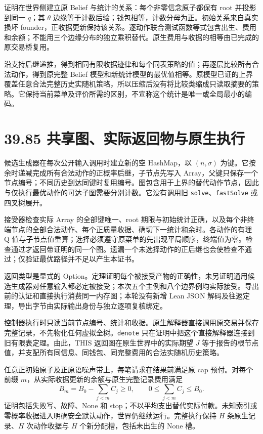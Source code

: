 \documentclass[
  11pt,
  oneside]{book}
\begin{document}
证明在世界侧建立原 Belief 与统计的关系：每个非零信念原子都保有 root 并投影到同一 \(q\)；其 \(\theta\) 边缘等于计数后验；钱包相等，计数分母为正。初始关系来自真实损坏 founder，正收据更新保持该关系。逐动作联合测试函数等式包含出生、费用和余额；不能用三个边缘分布的独立乘积替代。原生费用与收据的相等由已完成的原交易桥复用。

沿支持后继递推，得到相同有限收据迹律和每个同表策略的值；再逐层比较所有合法动作，得到原完整 Belief 模型和新统计模型的最优值相等。原模型已证的上界覆盖任意合法完整历史实随机策略，所以压缩后没有将比较类缩成只读取摘要的策略。它保持当前菜单及评价所需的区别，不宣称这个统计是唯一或全局最小的编码。

\section{39.85 共享图、实际返回物与原生执行}\label{ux5171ux4eabux56feux5b9eux9645ux8fd4ux56deux7269ux4e0eux539fux751fux6267ux884c}

候选生成器在每次公开输入调用时建立新的空 HashMap，以 \((n,\sigma)\) 为键。它按余时递减完成所有合法动作的正概率后继，子节点先写入 Array，父键只保存一个节点编号；不同历史到达同键时复用编号。图包含用于上界的替代动作节点，因此与仅执行最优动作的可达子图需要分别计数。它没有调用旧 \texttt{solve}、\texttt{fastSolve} 或四叉树展开。

接受器检查实际 Array 的全部键唯一、root 期限与初始统计正确，以及每个非终端节点的全部合法动作、每个正质量收据、确切下一统计和余时。各动作的有理 Q 值与子节点值重算；选择必须遵守原菜单的先出现平局顺序，终端值为零。检查通过才返回带证明的同一个图。遗漏一个未选择动作的正后继也会使检查不通过；仅验证最优路径并不足以产生本证书。

返回类型是显式的 Option。定理证明每个被接受产物的正确性，未另证明通用候选生成器对任意输入都必定被接受；本次五个主例和八个边界例均实际接受。导出前的认证和直接执行消费同一内存图；本轮没有新增 Lean JSON 解码及往返定理，导出字节由实际输出身份与独立逐项复核绑定。

控制器执行时只读当前节点编号、统计和收据。原生解释器直接调用原交易并保存完整记录，不先物化任何虚拟全树。\texttt{denote} 只在证明中把这个直接解释器连接到旧有限表定理。由此，THIS 返回图在原生世界中的实际期望 \(J\) 等于报告的根节点值，并支配所有同信息、同钱包、同完整费用的合法实随机历史策略。

任意正初始原子及正原语噪声带上，每笔请求在结果前满足原 cap 预付。对每个前缀 \(m\)，从实际收据更新的余额与原生完整记录费用满足 \[B_m=B_0-\sum_{j<m}C_j\ge0,\qquad 0\le\sum_{j<m}C_j\le B_0.\] 证明包括失败写、故障、None 和 stop；不以平均支出替代实际付款。未知索引或零概率收据进入明确安全默认动作，世界仍继续运行。完整执行保持 \(H\) 条原生记录、\(H\) 次动作收据与 \(H\) 个新分配槽，包括未出生的 None 槽。
\end{document}
